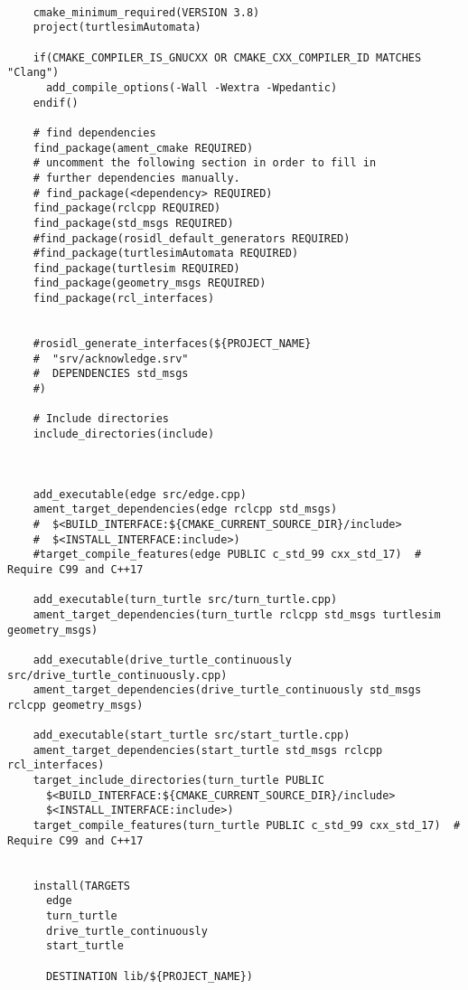 \lstset{style=cmakestyle}
\begin{lstlisting}[caption={CMakeLists.txt}, label={lst:CMakeLists}]

    cmake_minimum_required(VERSION 3.8)
    project(turtlesimAutomata)
    
    if(CMAKE_COMPILER_IS_GNUCXX OR CMAKE_CXX_COMPILER_ID MATCHES "Clang")
      add_compile_options(-Wall -Wextra -Wpedantic)
    endif()
    
    # find dependencies
    find_package(ament_cmake REQUIRED)
    # uncomment the following section in order to fill in
    # further dependencies manually.
    # find_package(<dependency> REQUIRED)
    find_package(rclcpp REQUIRED)
    find_package(std_msgs REQUIRED)
    #find_package(rosidl_default_generators REQUIRED)
    #find_package(turtlesimAutomata REQUIRED)
    find_package(turtlesim REQUIRED)
    find_package(geometry_msgs REQUIRED)
    find_package(rcl_interfaces)
    
    
    #rosidl_generate_interfaces(${PROJECT_NAME}
    #  "srv/acknowledge.srv"
    #  DEPENDENCIES std_msgs
    #)
    
    # Include directories
    include_directories(include)
    
    
    
    add_executable(edge src/edge.cpp)
    ament_target_dependencies(edge rclcpp std_msgs)
    #  $<BUILD_INTERFACE:${CMAKE_CURRENT_SOURCE_DIR}/include>
    #  $<INSTALL_INTERFACE:include>)
    #target_compile_features(edge PUBLIC c_std_99 cxx_std_17)  # Require C99 and C++17
    
    add_executable(turn_turtle src/turn_turtle.cpp)
    ament_target_dependencies(turn_turtle rclcpp std_msgs turtlesim geometry_msgs)
    
    add_executable(drive_turtle_continuously src/drive_turtle_continuously.cpp)
    ament_target_dependencies(drive_turtle_continuously std_msgs rclcpp geometry_msgs)
    
    add_executable(start_turtle src/start_turtle.cpp)
    ament_target_dependencies(start_turtle std_msgs rclcpp rcl_interfaces)
    target_include_directories(turn_turtle PUBLIC
      $<BUILD_INTERFACE:${CMAKE_CURRENT_SOURCE_DIR}/include>  
      $<INSTALL_INTERFACE:include>)
    target_compile_features(turn_turtle PUBLIC c_std_99 cxx_std_17)  # Require C99 and C++17
    
    
    install(TARGETS
      edge
      turn_turtle
      drive_turtle_continuously
      start_turtle
      
      DESTINATION lib/${PROJECT_NAME})
    

\end{lstlisting}
